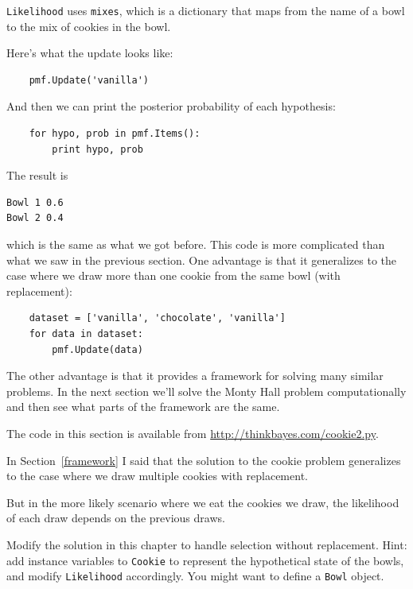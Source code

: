 \documentclass[12pt]{book}
\begin{document}
\verb"Likelihood" uses \verb"mixes", which is a dictionary
that maps from the name of a bowl to the mix of cookies in
the bowl.

Here's what the update looks like:

\begin{verbatim}
    pmf.Update('vanilla')
\end{verbatim}

And then we can print the posterior probability of each hypothesis:

\begin{verbatim}
    for hypo, prob in pmf.Items():
        print hypo, prob
\end{verbatim}

The result is

\begin{verbatim}
Bowl 1 0.6
Bowl 2 0.4
\end{verbatim}

which is the same as what we got before.  This code is more complicated
than what we saw in the previous section.  One advantage is that it
generalizes to the case where we draw more than one cookie from the
same bowl (with replacement):

\begin{verbatim}
    dataset = ['vanilla', 'chocolate', 'vanilla']
    for data in dataset:
        pmf.Update(data)
\end{verbatim}

The other advantage is that it provides a framework for solving many
similar problems.  In the next section we'll solve the Monty Hall
problem computationally and then see what parts of the framework are
the same.

The code in this section is available from
\url{http://thinkbayes.com/cookie2.py}.

\begin{exercise}

In Section~\ref{framework} I said that the solution to the cookie
problem generalizes to the case where we draw multiple cookies
with replacement.

But in the more likely scenario where we eat the cookies we draw,
the likelihood of each draw depends on the previous draws.

Modify the solution in this chapter to handle selection without
replacement.  Hint: add instance variables to {\tt Cookie} to
represent the hypothetical state of the bowls, and modify
{\tt Likelihood} accordingly.  You might want to define a 
{\tt Bowl} object.

\end{exercise}
\end{document}
